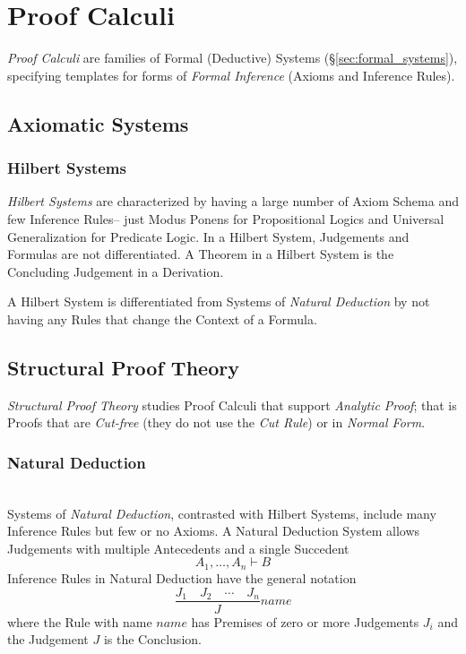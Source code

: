 \documentclass{article}
\begin{document}
\section{Proof Calculi}

\emph{Proof Calculi} are families of Formal (Deductive) Systems
(\S\ref{sec:formal_systems}), specifying templates for forms of
\emph{Formal Inference} (Axioms and Inference Rules).

\subsection{Axiomatic Systems}

\subsubsection{Hilbert Systems} \label{subsec:hilbert_systems}

\emph{Hilbert Systems} are characterized by having a large number of
Axiom Schema and few Inference Rules-- just Modus Ponens for
Propositional Logics and Universal Generalization for Predicate
Logic. In a Hilbert System, Judgements and Formulas are not
differentiated. A Theorem in a Hilbert System is the Concluding
Judgement in a Derivation.

A Hilbert System is differentiated from Systems of \emph{Natural
 Deduction} by not having any Rules that change the Context of a
Formula.

\subsection{Structural Proof Theory}

\emph{Structural Proof Theory} studies Proof Calculi that support
\emph{Analytic Proof}; that is Proofs that are \emph{Cut-free} (they
do not use the \emph{Cut Rule}) or in \emph{Normal Form}.

\subsubsection{Natural Deduction}\label{subsec:natural_deduction} \hfill
\\
Systems of \emph{Natural Deduction}\cite{prawitz65}, contrasted with
Hilbert Systems, include many Inference Rules but few or no Axioms. A
Natural Deduction System allows Judgements with multiple Antecedents
and a single Succedent
\[
    A_1,\ldots,A_n \vdash B
\]
Inference Rules in Natural Deduction have the general notation
\[
    {
        \frac{J_1 \quad J_2 \quad \cdots \quad J_n}
        {J}
    } name
\]
where the Rule with name $name$ has Premises of zero or more
Judgements $J_i$ and the Judgement $J$ is the Conclusion.
\end{document}
